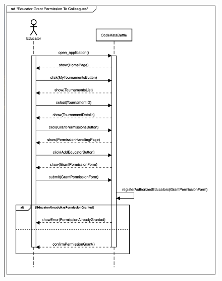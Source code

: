 \documentclass{Configuration_Files/Template}
\begin{document}
\begin{figure}[H]
\includegraphics[scale = 0.45]{Images/SequenceDiagrams/EducatorGrantsPermissionCollagueSeqDiagram.png}\\
\centering
\end{figure}
\end{document}

